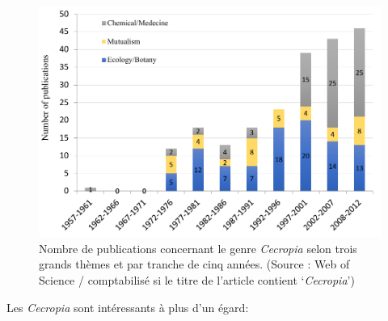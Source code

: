 \documentclass[a4paper]{article}
\theoremstyle{definition}
\theoremstyle{definition}
\theoremstyle{definition}
\theoremstyle{remark}
\begin{document}
\begin{figure}[H]

{\centering \includegraphics[width=1\linewidth]{figure/fig2} 

}

\caption{Nombre de publications concernant le genre \emph{Cecropia}
selon trois grands thèmes et par tranche de cinq années. (Source : Web
of Science / comptabilisé si le titre de l'article contient
`\emph{Cecropia}')}\label{fig:fig2}
\end{figure}

Les \emph{Cecropia} sont intéressants à plus d'un égard:
\end{document}

